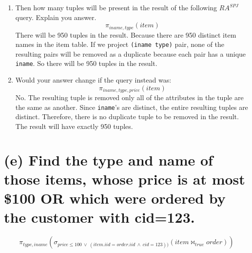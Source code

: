 \documentclass{article}
\begin{document}
\begin{enumerate}
\item  Then how many tuples will be present in the result of the following \(RA^{SPJ}\) query. Explain you answer.
\[
\pi_{iname, type}(item)
\]
There will be 950 tuples in the result. Because there are 950 distinct item names in the item table. If we project \texttt{(iname type)} pair, none of the resulting pairs will be removed as a duplicate because each pair has a unique \texttt{iname}. So there will be 950 tuples in the result.

\item Would your answer change if the query instead was:
\[
\pi_{iname, type, price}(item)
\]
No. The resulting tuple is removed only all of the attributes in the tuple are the same as another. Since \texttt{iname}'s are distinct, the entire resulting tuples are distinct. Therefore, there is no duplicate tuple to be removed in the result. The result will have exactly 950 tuples.

\end{enumerate}

\section{(e) Find the type and name of those items, whose price is at most \$100 OR which were ordered
by the customer with cid=123.}

\[
\pi_{type, iname}(\sigma_{price \leq 100 \ \vee \  (item.iid = order.iid \ \wedge \ cid=123))}(item \bowtie_{true} order))
\]
\\
\end{document}
